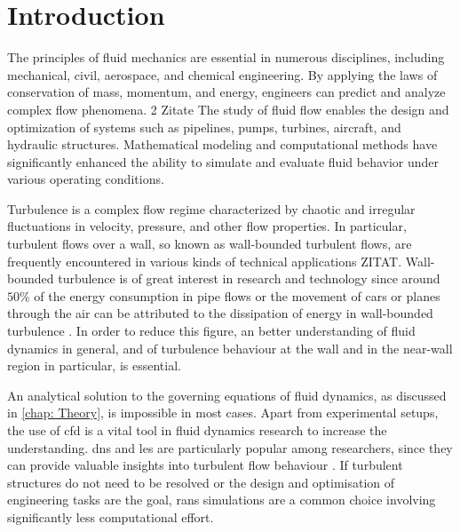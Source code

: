 \chapter{Introduction}\label{chap: Introduction}

The principles of fluid mechanics are essential in numerous disciplines, including mechanical, civil, aerospace, and chemical engineering. By applying the laws of conservation of mass, momentum, and energy, engineers can predict and analyze complex flow phenomena. 2 Zitate
 The study of fluid flow enables the design and optimization of systems such as pipelines, pumps, turbines, aircraft, and hydraulic structures. Mathematical modeling and computational methods have significantly enhanced the ability to simulate and evaluate fluid behavior under various operating conditions. 
 
 Turbulence is a complex flow regime characterized by chaotic and irregular fluctuations in velocity, pressure, and other flow properties.  
In particular,  turbulent flows over a wall, so known as wall-bounded turbulent flows, are  frequently encountered  in various kinds of technical applications ZITAT. 
Wall-bounded turbulence is of great interest in research and technology since around $50 \%$ of the energy consumption in pipe flows  or the movement of cars or planes through the air can be attributed to the dissipation of energy in wall-bounded turbulence \citep{jimenezCascadesWallBoundedTurbulence2012}.
In order to reduce this figure, an better understanding of fluid dynamics in general, and  of turbulence behaviour at the wall and in the near-wall region in particular, is essential.

An analytical solution to the governing equations of fluid dynamics, as  discussed in \autoref{chap: Theory}, is impossible in most cases.
Apart from experimental setups, the use of \acrfull{cfd} is a vital tool in fluid dynamics research to increase the understanding.
\acrfull{dns} and \acrfull{les} are particularly popular among  researchers, since they can provide valuable insights into  turbulent flow behaviour \citep{moinDIRECTNUMERICALSIMULATION1998}.
If turbulent structures do not need to be resolved or the design and optimisation of engineering tasks are the goal, \acrfull{rans} simulations are a common choice involving significantly less computational effort.



